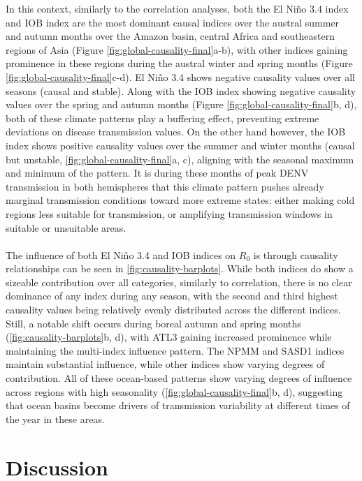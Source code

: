 \documentclass[10pt,twocolumn]{wlscirep}
\begin{document}
In this context, similarly to the correlation analyses, both the El Niño 3.4 index and IOB index are the most dominant causal indices over the austral summer and autumn months over the Amazon basin, central Africa and southeastern regions of Asia (Figure \ref{fig:global-causality-final}a-b), with other indices gaining prominence in these regions during the austral winter and spring months (Figure \ref{fig:global-causality-final}c-d). El Niño 3.4 shows negative causality values over all seasons (causal and stable). Along with the IOB index showing negative causality values over the spring and autumn months (Figure \ref{fig:global-causality-final}b, d), both of these climate patterns play a buffering effect, preventing extreme deviations on disease transmission values. On the other hand however, the IOB index shows positive causality values over the summer and winter months (causal but unstable, \ref{fig:global-causality-final}a, c), aligning with the seasonal maximum and minimum of the pattern. It is during these months of peak DENV transmission in both hemispheres that this climate pattern pushes already marginal transmission conditions toward more extreme states: either making cold regions less suitable for transmission, or amplifying transmission windows in suitable or unsuitable areas.
\\
\\
The influence of both El Niño 3.4 and IOB indices on $R_0$ is through causality relationships can be seen in \ref{fig:causality-barplots}. While both indices do show a sizeable contribution over all categories, similarly to correlation, there is no clear dominance of any index during any season, with the second and third highest causality values being relatively evenly distributed across the different indices. Still, a notable shift occurs during boreal autumn and spring months (\ref{fig:causality-barplots}b, d), with ATL3 gaining increased prominence while maintaining the multi-index influence pattern. The NPMM and SASD1 indices maintain substantial influence, while other indices show varying degrees of contribution. All of these ocean-based patterns show varying degrees of influence across regions with high seasonality (\ref{fig:global-causality-final}b, d), suggesting that ocean basins become drivers of transmission variability at different times of the year in these areas.

\section{Discussion} \label{sec-discussion}
\end{document}
